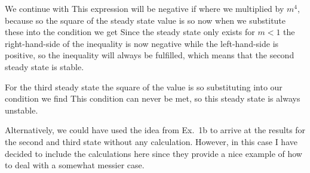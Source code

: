 We continue with 
This expression will be negative if 
where we multiplied by $m^4$, because
so the square of the steady state value is 
so now when we substitute these into the condition we get 
Since the steady state only exists for $m<1$ the right-hand-side of the inequality is now negative while the left-hand-side is positive, so the inequality will always be fulfilled, which means that the second steady state is stable.

For the third steady state 
the square of the value is 
so substituting into our condition we find 
This condition can never be met, so this steady state is always unstable. 

Alternatively, we could have used the idea from Ex.~1b to arrive at the results for the second and third state without any calculation. However, in this case I have decided to include the calculations here since they provide a nice example of how to deal with a somewhat messier case.  

